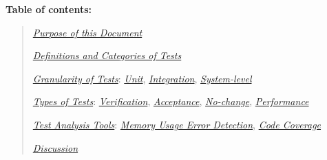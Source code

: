 \documentclass[]{article}
\date{}
\begin{document}
\pagestyle{fancy}
\renewcommand{\headrulewidth}{0pt}
  
\thispagestyle{empty}
\textbf{\newline}
\textbf{\newline}
\textbf{\newline}

\textbf{Table of contents:}

\begin{quote}
\protect\hyperlink{purpose-of-this-document}{\emph{Purpose of this
Document}}

\protect\hyperlink{definitions-and-categories-of-tests}{\emph{Definitions
and Categories of Tests}}

\protect\hyperlink{granularity-of-tests}{\emph{Granularity of Tests}}:
\protect\hyperlink{id.5saje75168fl}{\emph{Unit}},
\protect\hyperlink{id.j931ebv6xsmb}{\emph{Integration}},
\protect\hyperlink{id.vllu2z1lvhtb}{\emph{System-level}}

\protect\hyperlink{types-of-tests}{\emph{Types of Tests}}:
\protect\hyperlink{id.ew32p2pvdumb}{\emph{Verification}},
\protect\hyperlink{id.vshb6z6grels}{\emph{Acceptance}},
\protect\hyperlink{id.h6jkn7ujujea}{\emph{No-change}},
\protect\hyperlink{id.aq6w7wcjeigv}{\emph{Performance}}

\protect\hyperlink{test-analysis-tools}{\emph{Test Analysis Tools}}:
\protect\hyperlink{id.6n6lrjjln67m}{\emph{Memory Usage Error
Detection}}, \protect\hyperlink{id.sxuj9tgusjrf}{\emph{Code Coverage}}

\protect\hyperlink{discussion}{\emph{Discussion}}
\end{quote}
\end{document}
